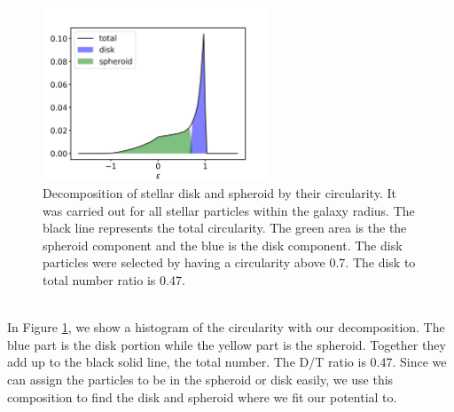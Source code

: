 \begin{figure}%
\captionsetup{format=plain}
    \centering
    \includegraphics[width=0.6\textwidth]{plots/Auriga/decomposition_snap_127.png}
\caption{Decomposition of stellar disk and spheroid by their circularity. It was carried out for all stellar particles within the galaxy radius. The black line represents the total circularity. The green area is the the spheroid component and the blue is the disk component. The disk particles were selected by having a circularity above 0.7. The disk to total number ratio is 0.47.}\label{fig:decomposition}
\end{figure}

\\In Figure \ref{fig:decomposition}, we show a histogram of the circularity with our decomposition. The blue part is the disk portion while the yellow part is the spheroid. Together they add up to the black solid line, the total number. The \ac{D/T} ratio is 0.47.
Since we can assign the particles to be in the spheroid or disk easily, we use this composition to find the disk and spheroid where we fit our potential to. 


